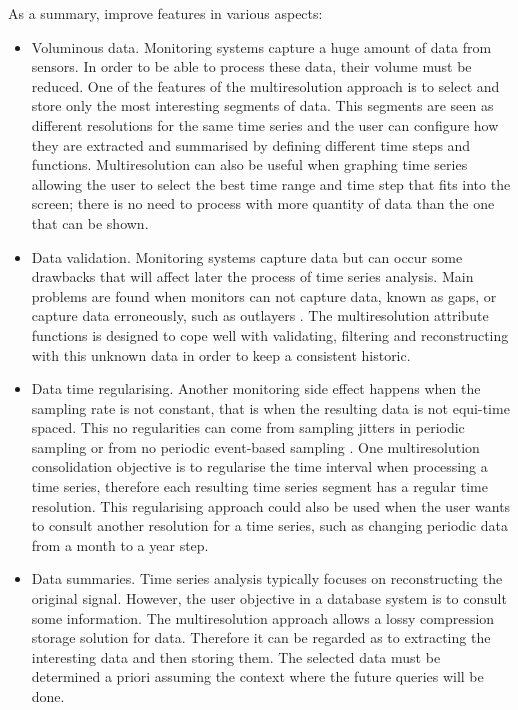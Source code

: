 As a summary,  improve  features in various aspects:
\begin{itemize}

\item Voluminous data. Monitoring systems capture a huge amount of
  data from sensors. In order to be able to process these data,
  their volume must be reduced. One of the features of the
  multiresolution approach is to select and store only the most
  interesting segments of data. This segments are seen as different
  resolutions for the same time series and the user can configure how
  they are extracted and summarised by defining different time steps
  and functions. Multiresolution can also be useful when graphing time
  series allowing the user to select the best time range and time
  step that fits into the screen; there is no need to process with
  more quantity of data than the one that can be
  shown.

\item Data validation. Monitoring systems capture data but can occur
  some drawbacks that will affect later the process of time series
  analysis. Main problems are found when monitors can not capture
  data, known as gaps, or capture data erroneously, such as outlayers
  \cite{quevedo10}.  The multiresolution attribute functions is
  designed to cope well with validating, filtering and reconstructing
  with this unknown data in order to keep a consistent
  historic.

\item Data time regularising. Another monitoring side effect happens
  when the sampling rate is not constant, that is when the resulting
  data is not equi-time spaced. This no regularities can come from
  sampling jitters in periodic sampling or from no periodic
  event-based sampling \cite{kopetz11:realtime}. One multiresolution
  consolidation objective is to regularise the time interval when
  processing a time series, therefore each resulting time series
  segment has a regular time resolution. This regularising approach
  could also be used when the user wants to consult another resolution
  for a time series, such as changing periodic data from a month to a
  year step.

\item Data summaries. Time series analysis typically focuses on
  reconstructing the original signal. However, the user objective in a
  database system is to consult some information. The multiresolution
  approach allows a lossy compression storage solution for data. Therefore
  it can be regarded as to extracting the interesting data and
  then storing them. The selected data must be determined a
  priori assuming the context where the future queries will be done.
\end{itemize}


